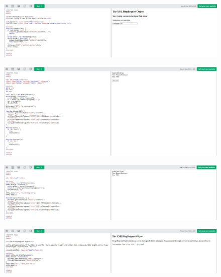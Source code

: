 \documentclass{article}
\begin{document}
\begin{itemize}
\begin{figure}[H]
		\end{figure}
		\begin{figure}[H]
			\centering
			\includegraphics[width=1.0\textwidth,keepaspectratio]{img/w17.jpg}
		\end{figure}
		\begin{figure}[H]
			\centering
			\includegraphics[width=1.0\textwidth,keepaspectratio]{img/w18.jpg}
		\end{figure}
		\begin{figure}[H]
			\centering
			\includegraphics[width=1.0\textwidth,keepaspectratio]{img/w19.jpg}
		\end{figure}
		\begin{figure}[H]
			\centering
			\includegraphics[width=1.0\textwidth,keepaspectratio]{img/w20.jpg}

\end{figure}
\end{itemize}
\end{document}
